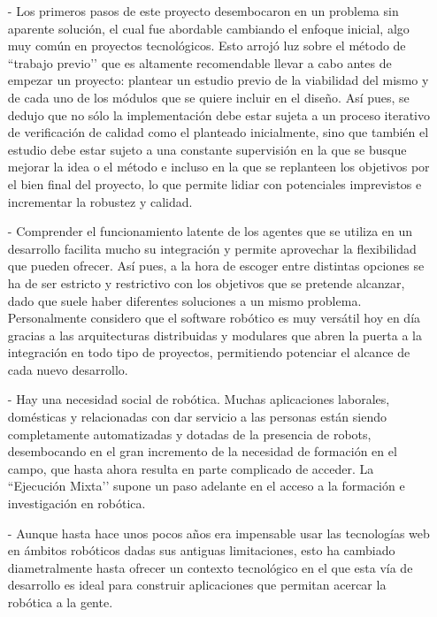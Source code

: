 \begin{itemize}
    \item [-] Los primeros pasos de este proyecto desembocaron en un problema sin aparente solución, el cual fue abordable cambiando el enfoque inicial, algo muy común en proyectos tecnológicos. Esto arrojó luz sobre el método de ``trabajo previo’’ que es altamente recomendable llevar a cabo antes de empezar un proyecto: plantear un estudio previo de la viabilidad del mismo y de cada uno de los módulos que se quiere incluir en el diseño. Así pues, se dedujo que no sólo la implementación debe estar sujeta a un proceso iterativo de verificación de calidad como el planteado inicialmente, sino que también  el estudio debe estar sujeto a una constante supervisión en la que se busque mejorar la idea o el método e incluso en la que se replanteen los objetivos por el bien final del proyecto, lo que permite lidiar con potenciales imprevistos e incrementar la robustez y calidad.
    \item [-] Comprender el funcionamiento latente de los agentes que se utiliza en un desarrollo facilita mucho su integración y permite aprovechar la flexibilidad que pueden ofrecer. Así pues, a la hora de escoger entre distintas opciones se ha de ser estricto y restrictivo con los objetivos que se pretende alcanzar, dado que suele haber diferentes soluciones a un mismo problema. Personalmente considero que el software robótico es muy versátil hoy en día gracias a las arquitecturas distribuidas y modulares que abren la puerta a la integración en todo tipo de proyectos, permitiendo potenciar el alcance de cada nuevo desarrollo.
    \item [-] Hay una necesidad social de robótica. Muchas aplicaciones laborales, domésticas y relacionadas con dar servicio a las personas están siendo completamente automatizadas y dotadas de la presencia de robots, desembocando en el gran incremento de la necesidad de formación en el campo, que hasta ahora resulta en parte complicado de acceder. La ``Ejecución Mixta’’ supone un paso adelante en el acceso a la formación e investigación en robótica.
    \item [-] Aunque hasta hace unos pocos años era impensable usar las tecnologías web en ámbitos robóticos dadas sus antiguas limitaciones, esto ha cambiado diametralmente hasta ofrecer un contexto tecnológico en el que esta vía de desarrollo es ideal para construir aplicaciones que permitan acercar la robótica a la gente.

\end{itemize}
